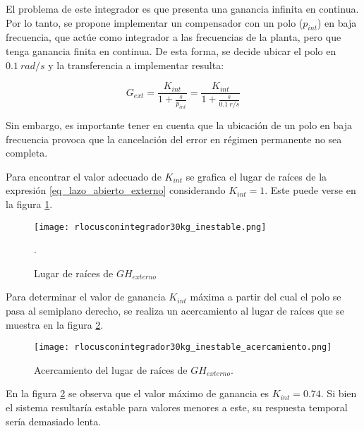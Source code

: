 El problema de este integrador es que presenta una ganancia infinita en continua. Por lo tanto, se propone implementar un compensador con un polo ($p_{int}$) en baja frecuencia, que actúe como integrador a las frecuencias de la planta, pero que tenga ganancia finita en continua. De esta forma, se decide ubicar el polo en $0.1\:rad/s$ y la transferencia a implementar resulta:

\begin{equation}
	G_{ext}=\frac{K_{int}}{1+\frac{s}{p_{int}}}=\frac{K_{int}}{1+\frac{s}{0.1\:r/s}}	
\end{equation}

Sin embargo, es importante tener en cuenta que la ubicación de un polo en baja frecuencia provoca que la cancelación del error en régimen permanente no sea completa.


Para encontrar el valor adecuado de $K_{int}$ se grafica el lugar de raíces de la expresión \ref{eq_lazo_abierto_externo} considerando $K_{int}=1$. Este puede verse en la figura \ref{fig:lugar-de-raices-con-integrador-analog_inestable}.

\begin{figure}[H]
	\centering
	\texttt{[image: rlocusconintegrador30kg\_inestable.png]}
	\caption{Lugar de raíces de $GH_{externo}$}.
	\label{fig:lugar-de-raices-con-integrador-analog_inestable}
\end{figure}

Para determinar el valor de ganancia $K_{int}$ máxima a partir del cual el polo se pasa al semiplano derecho, se realiza un acercamiento al lugar de raíces que se muestra en la figura \ref{fig:lugar-de-raices-con-integrador-analog_inestable_acercamiento}. 

\begin{figure}[H]
	\centering
	\texttt{[image: rlocusconintegrador30kg\_inestable\_acercamiento.png]}
	\caption{Acercamiento del lugar de raíces de $GH_{externo}$.}
	\label{fig:lugar-de-raices-con-integrador-analog_inestable_acercamiento}
\end{figure}

En la figura \ref{fig:lugar-de-raices-con-integrador-analog_inestable_acercamiento} se observa que el valor máximo de ganancia es $K_{int}=0.74$. Si bien el sistema resultaría estable para valores menores a este, su respuesta temporal sería demasiado lenta. 


